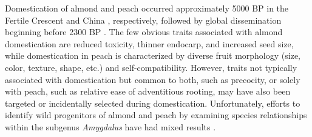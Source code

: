 \documentclass[12pt]{article}
\begin{document}
Domestication of almond and peach occurred approximately 5000 BP in the Fertile Crescent and China \citep{zohary2012domestication}, respectively, followed by global dissemination beginning before 2300 BP \citep{hedrick1917peaches, edwards1975almond, gradziel2011origin, zheng2014archaeological}. 
%
%
The few obvious traits associated with almond domestication are reduced toxicity, thinner endocarp, and increased seed size, while domestication in peach is characterized by diverse fruit morphology (size, color, texture, shape, etc.) and self-compatibility.
%
However, traits not typically associated with domestication but common to both, such as precocity, or solely with peach, such as relative ease of adventitious rooting, may have also been targeted or incidentally selected during domestication. 
%
Unfortunately, efforts to identify wild progenitors of almond and peach by examining species relationships within the subgenus \emph{Amygdalus} have had mixed results \citep{verde2013high, aradhya2004molecular, zeinalabedini2010origin, mowrey1990isozyme, browicz1996genus, ladizinsky1999origin, bassi20081}. 
\end{document}
